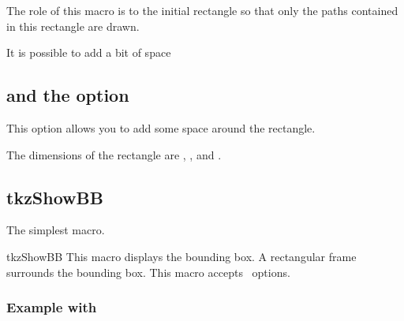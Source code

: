 The role of this macro is to  the initial rectangle so that only the paths contained in this rectangle are drawn.

\begin{tkzexample}[latex=8cm,small]
\end{tkzexample} 

It is possible to add a bit of space
\begin{tkzltxexample}[]
  \tkzClip[space=1]
\end{tkzltxexample} 

\subsection{ and the option } 
This option allows you to add some space around the  rectangle.
\begin{tkzexample}[latex=8cm,small]
\end{tkzexample}   
The dimensions of the  rectangle are , ,  and . 

\subsection{tkzShowBB}
The simplest macro. 
\begin{NewMacroBox}{tkzShowBB}{}%
This macro displays the bounding box. A rectangular frame surrounds the bounding box. This macro accepts \TIKZ\ options.
\end{NewMacroBox} 


\subsubsection{Example with }
\begin{tkzexample}[latex=8cm,small]
\end{tkzexample}
